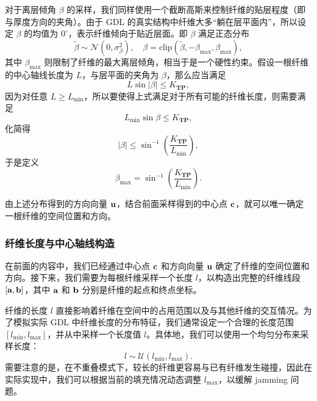 对于离层倾角 $\beta$ 的采样，我们同样使用一个截断高斯来控制纤维的贴层程度（即与厚度方向的夹角）。由于 GDL 的真实结构中纤维大多“躺在层平面内”，所以设定 $\beta$ 的均值为 $0^\circ$，表示纤维倾向于贴近层面。即 $\beta$ 满足正态分布
\begin{equation}
\tilde\beta \sim \mathcal{N}(0, \sigma_\beta^2), \quad \beta = \text{clip}(\tilde\beta, -\beta_{\max}, \beta_{\max}),
\end{equation}
其中 $\beta_{\max}$ 则限制了纤维的最大离层倾角，相当于是一个硬性约束。假设一根纤维的中心轴线长度为 $L$，与层平面的夹角为 $\beta$，那么应当满足
\begin{equation}
L \sin|\beta| \le K_{\textbf{TP}},
\end{equation}
因为对任意 $L \ge L_{\min}$，所以要使得上式满足对于所有可能的纤维长度，则需要满足
\begin{equation}
L_{\min} \sin\beta \le K_{\textbf{TP}},
\end{equation}
化简得
\begin{equation}
|\beta| \le \sin^{-1}\left(\dfrac{K_{\textbf{TP}}}{L_{\min}}\right),
\end{equation}
于是定义
\begin{equation}
\beta_{\max} = \sin^{-1}\left(\dfrac{K_{\textbf{TP}}}{L_{\min}}\right).
\end{equation}

由上述分布得到的方向向量 $\textbf u$，结合前面采样得到的中心点 $\textbf c$，就可以唯一确定一根纤维的空间位置和方向。

\subsubsection{\textbf{纤维长度与中心轴线构造}}

在前面的内容中，我们已经通过中心点 $\textbf c$ 和方向向量 $\textbf u$ 确定了纤维的空间位置和方向。接下来，我们需要为每根纤维采样一个长度 $l$，以构造出完整的纤维线段 $[\textbf a, \textbf b]$，其中 $\textbf a$ 和 $\textbf b$ 分别是纤维的起点和终点坐标。

纤维的长度 $l$ 直接影响着纤维在空间中的占用范围以及与其他纤维的交互情况。为了模拟实际 GDL 中纤维长度的分布特征，我们通常设定一个合理的长度范围 $[l_{\min}, l_{\max}]$，并从中采样一个长度值 $l$。具体地，我们可以使用一个均匀分布来采样长度：
\begin{equation}
l \sim \mathcal{U}(l_{\min}, l_{\max}).
\end{equation}
需要注意的是，在不重叠模式下，较长的纤维更容易与已有纤维发生碰撞，因此在实际实现中，我们可以根据当前的填充情况动态调整 $l_{\max}$，以缓解 jamming 问题。

